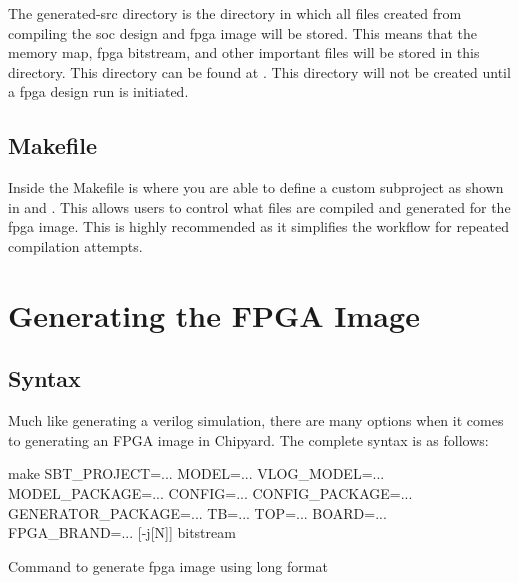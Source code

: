 
The generated-src directory is the directory in which all files created from compiling the \Gls{soc} design and \Gls{fpga} image will be stored.
This means that the memory map, \Gls{fpga} bitstream, and other important files will be stored in this directory.
This directory can be found at .
This directory will not be created until a \Gls{fpga} design run is initiated.

\subsection{Makefile}\label{sec:Customizing_FPGA-Makefile}
Inside the Makefile is where you are able to define a custom subproject as shown in  and .
This allows users to control what files are compiled and generated for the \Gls{fpga} image.
This is highly recommended as it simplifies the workflow for repeated compilation attempts.

\section{Generating the FPGA Image}\label{sec:Generating_FPGA_Image}

\subsection{Syntax}\label{sec:Generating_FPGA_Image-Syntax}
Much like generating a verilog simulation, there are many options when it comes to generating an FPGA image in Chipyard.
The complete syntax is as follows:~\cite{Chipyard_Prototyping}

\begin{listing}[h!tbp]
  \begin{bashsource}
    make SBT_PROJECT=... MODEL=... VLOG_MODEL=... MODEL_PACKAGE=... CONFIG=... CONFIG_PACKAGE=... GENERATOR_PACKAGE=... TB=... TOP=... BOARD=... FPGA_BRAND=... [-j[N]] bitstream
  \end{bashsource}
  \caption{Command to generate \Gls{fpga} image using long format}
  \label{lst:extended_fpga_cmd}
\end{listing}

